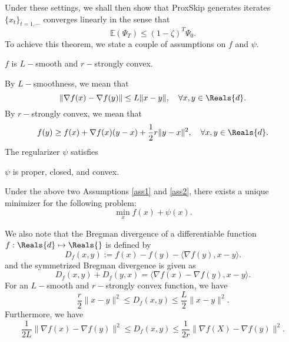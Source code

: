 \begin{itemize}
Under these settings, we shall then show that ProxSkip generates iterates 
$\{x_t\}_{t = 1,\cdots}$ converges linearly in the sense that 
\begin{equation}
\mathbb{E}(\Psi_T) \leq (1 - \zeta)^T \Psi_0. 
\end{equation}
To achieve this theorem, we state a couple of assumptions on $f$ and $\psi$. 
\begin{assump}\label{ass1} 
$f$ is $L-$smooth and $r-$strongly convex. 
\end{assump}
By $L-$smoothness, we mean that 
\begin{equation}
\|\nabla f(x) - \nabla f(y) \| \leq L \|x - y\|, \quad \forall x, y \in \Reals{d}. 
\end{equation}
By $r-$strongly convex, we mean that 
\begin{equation}
f(y) \geq f(x) + \nabla f(x) ( y - x) +\frac{1}{2} r \|y - x\|^2, \quad \forall x, y \in \Reals{d}.  
\end{equation}
The regularizer $\psi$ satisfies
\begin{assump}\label{ass2} 
$\psi$ is proper, closed, and convex. 
\end{assump}
\begin{lemma} 
Under the above two Assumptions \ref{ass1} and \ref{ass2}, there exists a unique minimizer for the following problem: 
\begin{equation}
\min_{x} f(x) + \psi(x). 
\end{equation}
\end{lemma}
We also note that the Bregman divergence of a differentiable function $f: \Reals{d} \mapsto \Reals{}$ is defined by
\begin{equation} 
D_f(x,y) := f(x) - f(y) - \langle \nabla f(y), x - y \rangle. 
\end{equation} 
and the symmetrized Bregman divergence is given as 
\begin{equation} 
D_f(x,y) + D_f(y,x) = \langle \nabla f(x)  - \nabla f(y), x - y \rangle.  
\end{equation} 
For an $L-$smooth and $r-$strongly convex function, we have 
\begin{equation} 
\frac{r}{2} \|x - y\|^2 \leq D_f(x,y) \leq \frac{L}{2} \|x - y\|^2.
\end{equation} 
Furthermore, we have 
\begin{equation} 
\frac{1}{2L} \|\nabla f(x) - \nabla f(y)\|^2 \leq D_f(x,y) \leq \frac{1}{2r} \|\nabla f(X) - \nabla f(y)\|^2. 
\end{equation} 

\end{itemize}
